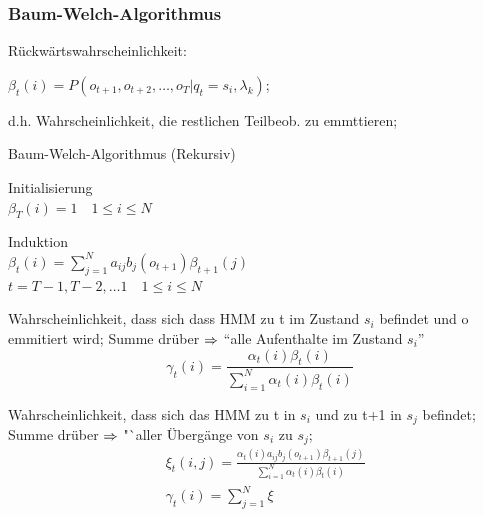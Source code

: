 \documentclass[german,color,6pt]{latex4ei/latex4ei_sheet}
\begin{document}
\begin{sectionbox}
\subsubsection{Baum-Welch-Algorithmus}
Rückwärtswahrscheinlichkeit:

 $\beta_t(i) = P(o_{t+1}, o_{t+2}, \dots , o_{T} | q_t = s_i , \lambda _k)$; 

d.h. Wahrscheinlichkeit, die restlichen Teilbeob. zu emmttieren;

\begin{cookbox}{Baum-Welch-Algorithmus (Rekursiv)}
	\item Initialisierung\\
		 $\beta_T (i) = 1 \quad 1 \leq i \leq N $\\
	\item Induktion\\
		$\beta_t(i) = \sum\limits_{j=1}^N a_{ij} b_j (o_{t+1}) \beta_{t+1} (j)$\\
		$t = T-1, T-2, \dots 1 \quad 1 \leq i \leq N$\\
\end{cookbox}

Wahrscheinlichkeit, dass sich dass HMM zu t im Zustand $s_i$ befindet und o emmitiert wird; Summe drüber $\Rightarrow$  "`alle Aufenthalte im Zustand $s_i$"'
\begin{equation*}
\gamma _t (i) = \frac{\alpha_t (i) \beta_t (i)}{\sum \limits_{i=1}^N \alpha_t (i) \beta_t (i)}
\end{equation*}

Wahrscheinlichkeit, dass sich das HMM zu t in $s_i$ und zu t+1 in $s_j$ befindet; Summe drüber $\Rightarrow$ "`aller Übergänge von $s_i$ zu $s_j$; 
\begin{equation*}
\begin{split}
&\xi_t (i,j) = \frac{\alpha _t (i) a_{ij} b_j (o_{t+1}) \beta_{t+1}(j)}{\sum \limits_{i=1}^N \alpha_t (i) \beta_t (i)}\\
&\gamma_t (i) = \sum\limits_{j=1}^N \xi
\end{split}
\end{equation*}

\end{sectionbox}
\end{document}
